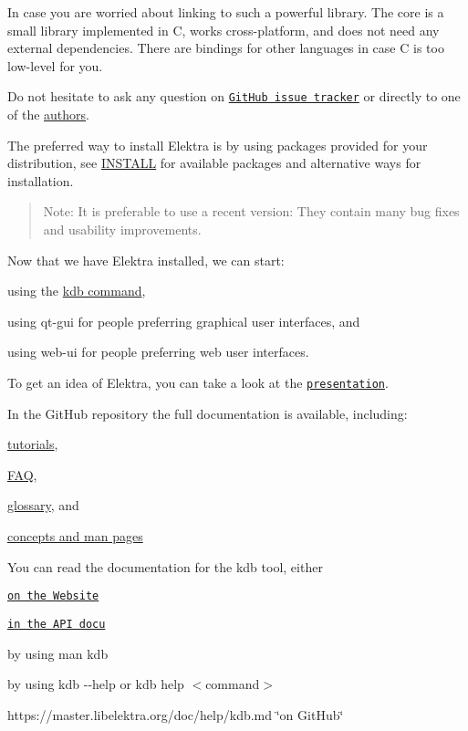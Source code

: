 In case you are worried about linking to such a powerful library. The core is a small library implemented in C, works cross-\/platform, and does not need any external dependencies. There are bindings for other languages in case C is too low-\/level for you.

Do not hesitate to ask any question on \href{https://issues.libelektra.org/}{\tt Git\+Hub issue tracker} or directly to one of the \hyperlink{doc_AUTHORS_md}{authors}.

The preferred way to install Elektra is by using packages provided for your distribution, see \hyperlink{doc_INSTALL_md}{I\+N\+S\+T\+A\+LL} for available packages and alternative ways for installation.

\begin{quote}
Note\+: It is preferable to use a recent version\+: They contain many bug fixes and usability improvements. \end{quote}


Now that we have Elektra installed, we can start\+:


\begin{DoxyItemize}
\item using the \hyperlink{doc_help_kdb_md}{kdb command},
\item using qt-\/gui for people preferring graphical user interfaces, and
\item using web-\/ui for people preferring web user interfaces.
\end{DoxyItemize}

To get an idea of Elektra, you can take a look at the \href{https://www.libelektra.org/ftp/elektra/presentations/2016/FOSDEM/fosdem.odp}{\tt presentation}.

In the Git\+Hub repository the full documentation is available, including\+:


\begin{DoxyItemize}
\item \hyperlink{md_doc_tutorials_README_doc_tutorials_README_md}{tutorials},
\item \hyperlink{doc_help_elektra-faq_md}{F\+AQ},
\item \hyperlink{doc_help_elektra-glossary_md}{glossary}, and
\item \hyperlink{doc_help_elektra-introduction_md}{concepts and man pages}
\end{DoxyItemize}

You can read the documentation for the kdb tool, either


\begin{DoxyItemize}
\item \href{https://www.libelektra.org}{\tt on the Website}
\item \href{https://doc.libelektra.org/api/master/html/doc_help_kdb_md.html}{\tt in the A\+PI docu}
\item by using {\ttfamily man kdb}
\item by using {\ttfamily kdb -\/-\/help} or {\ttfamily kdb help $<$command$>$}
\item https\+://master.libelektra.\+org/doc/help/kdb.md \char`\"{}on Git\+Hub\char`\"{}
\end{DoxyItemize}


